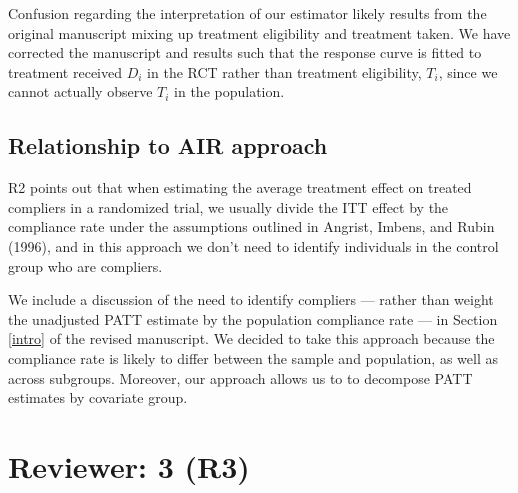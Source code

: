 \documentclass[hidelinks,12pt,letterpaper]{article}
\begin{document}
Confusion regarding the interpretation of our estimator likely results from the original manuscript mixing up treatment eligibility and treatment taken. We have corrected the manuscript and results such that the response curve is fitted to treatment received $D_i$ in the RCT rather than treatment eligibility, $T_i$, since we cannot actually observe $T_i$ in the population. 

\subsection{Relationship to AIR approach}\label{reweighting}

R2 points out that when estimating the average treatment effect on treated compliers in a randomized trial, we usually divide the ITT effect by the compliance rate under the assumptions outlined in Angrist, Imbens, and Rubin (1996), and in this approach we don't need to identify individuals in the control group who are compliers.

We include a discussion of the need to identify compliers --- rather than weight the unadjusted PATT estimate by the population compliance rate --- in Section \ref{intro} of the revised manuscript. We decided to take this approach because the compliance rate is likely to differ between the sample and population, as well as across subgroups. Moreover, our approach allows us to to decompose PATT estimates by covariate group. 

\section{Reviewer: 3 (R3)}
\end{document}
